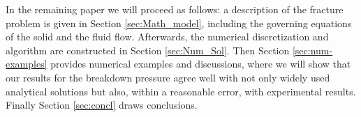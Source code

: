 In the remaining paper we will proceed as follows:  a description of the fracture problem is given in  Section \ref{sec:Math_model}, including the governing equations of the solid and the fluid flow. Afterwards, the numerical discretization and algorithm are constructed in Section \ref{sec:Num_Sol}. Then Section \ref{sec:num-examples} provides numerical examples and discussions, where we will show that our results for the breakdown pressure agree well with not only widely used analytical solutions but also, within a reasonable error, with experimental results. Finally Section \ref{sec:concl} draws conclusions. %